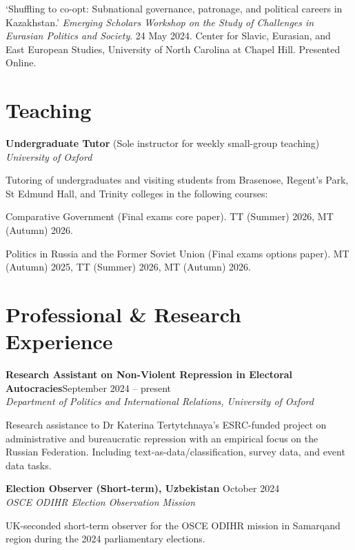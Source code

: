 \documentclass[11pt, a4paper]{article}
\begin{document}
`Shuffling to co-opt: Subnational governance, patronage, and political careers in Kazakhstan.' \textit{Emerging Scholars Workshop on the Study of Challenges in Eurasian Politics and Society}. 24 May 2024. Center for Slavic, Eurasian, and East European Studies, University of North Carolina at Chapel Hill. Presented Online.

\section{Teaching}

\textbf{Undergraduate Tutor} (Sole instructor for weekly small-group teaching)\\
\textit{University of Oxford}

Tutoring of undergraduates and visiting students from Brasenose, Regent's Park, St Edmund Hall, and Trinity  colleges in the following courses:

Comparative Government (Final exams core paper). TT (Summer) 2026, MT (Autumn) 2026.

Politics in Russia and the Former Soviet Union (Final exams options paper). MT (Autumn) 2025, TT (Summer) 2026, MT (Autumn) 2026.

\section{Professional \& Research Experience}

\begin{samepage}
  \textbf{Research Assistant on Non-Violent Repression in Electoral Autocracies}\hfill{}\linebreak September 2024 -- present\\
  \textit{Department of Politics and International Relations, University of Oxford}

Research assistance to Dr Katerina Tertytchnaya's ESRC-funded project on administrative and bureaucratic repression with an empirical focus on the Russian Federation. Including text-as-data/classification, survey data, and event data tasks.
\end{samepage}

\begin{samepage}
  \textbf{Election Observer (Short-term), Uzbekistan} \hfill October 2024\\
  \textit{OSCE ODIHR Election Observation Mission}

UK-seconded short-term observer for the OSCE ODIHR mission in Samarqand region during the 2024 parliamentary elections.
\end{samepage}
\end{document}
